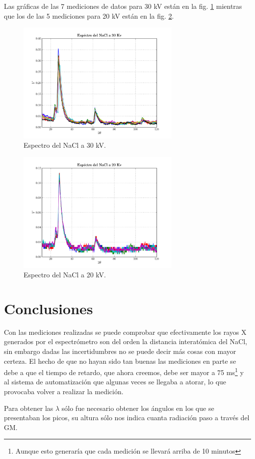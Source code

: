 \documentclass[letterpaper,10pt,twocolumn]{article}
\numberwithin{equation}{section}
\begin{document}
Las gráficas de las 7 mediciones de datos para 30 kV están en la fig. \ref{fig:30kv}
mientras que los de las 5 mediciones para 20 kV están en la fig. \ref{fig:20kv}.

\begin{figure}[H]
  \centering
  \includegraphics[width=8cm,trim= 0.7cm 0.3cm 1.7cm 0.8cm,clip]{30kv}
  \caption{Espectro del NaCl a 30 kV.}
  \label{fig:30kv}
\end{figure}

\begin{figure}[H]
  \centering
  \includegraphics[width=8cm,trim= 0.7cm 0.3cm 1.7cm 0.8cm,clip]{20kv}
  \caption{Espectro del NaCl a 20 kV.}
  \label{fig:20kv}
\end{figure}

\section{Conclusiones}
\label{sec:conclusiones}

Con las mediciones realizadas se puede comprobar que efectivamente los rayos X generados por
el espectrómetro son del orden la distancia interatómica del NaCl, sin embargo dadas las
incertidumbres no se puede decir más cosas con mayor certeza. El hecho de que no hayan sido
tan buenas las mediciones en parte se debe a que el tiempo de retardo, que ahora creemos, debe
ser mayor a 75 ms\footnote{Aunque esto generaría que cada medición se llevará arriba de 10
  minutos} y al sistema de automatización que algunas veces se llegaba a atorar, lo que
provocaba volver a realizar la medición.

Para obtener las $\lambda$ sólo fue necesario obtener los ángulos en los que se presentaban
los picos, su altura sólo nos indica cuanta radiación paso a través del GM.



\end{document}
